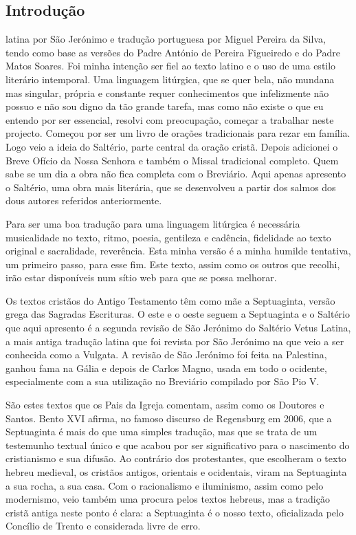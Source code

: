 
\subsection{Introdução}

 latina por São Jerónimo e tradução portuguesa por Miguel Pereira da Silva, tendo como base as versões do Padre António de Pereira Figueiredo e do Padre Matos Soares. Foi minha intenção ser fiel ao texto latino e o uso de uma estilo literário intemporal. Uma linguagem litúrgica, que se quer bela, não mundana mas singular, própria e constante requer conhecimentos que infelizmente não possuo e não sou digno da tão grande tarefa, mas como não existe o que eu entendo por ser essencial, resolvi com preocupação, começar a trabalhar neste projecto. Começou por ser um livro de orações tradicionais para rezar em família. Logo veio a ideia do Saltério, parte central da oração cristã. Depois adicionei o Breve Ofício da Nossa Senhora e também o Missal tradicional completo. Quem sabe se um dia a obra não fica completa com o Breviário. Aqui apenas apresento o Saltério, uma obra mais literária, que se desenvolveu a partir dos salmos dos dous autores referidos anteriormente.

Para ser uma boa tradução para uma linguagem litúrgica é necessária musicalidade no texto, ritmo, poesia, gentileza e cadência, fidelidade ao texto original e sacralidade, reverência. Esta minha versão é a minha humilde tentativa, um primeiro passo, para esse fim. Este texto, assim como os outros que recolhi, irão estar disponíveis num sítio web para que se possa melhorar.

Os textos cristãos do Antigo Testamento têm como mãe a Septuaginta, versão grega das Sagradas Escrituras. O este e o oeste seguem a Septuaginta e o Saltério que aqui apresento é a segunda revisão de São Jerónimo do Saltério Vetus Latina, a mais antiga tradução latina que foi revista por São Jerónimo na que veio a ser conhecida como a Vulgata. A revisão de São Jerónimo foi feita na Palestina, ganhou fama na Gália e depois de Carlos Magno, usada em todo o ocidente, especialmente com a sua utilização no Breviário compilado por São Pio V.

São estes textos que os Pais da Igreja comentam, assim como os Doutores e Santos. Bento XVI afirma, no famoso discurso de Regensburg em 2006, que a Septuaginta é mais do que uma simples tradução, mas que se trata de um testemunho textual único e que acabou por ser significativo para o nascimento do cristianismo e sua difusão. Ao contrário dos protestantes, que escolheram o texto hebreu medieval, os cristãos antigos, orientais e ocidentais, viram na Septuaginta a sua rocha, a sua casa. Com o racionalismo e iluminismo, assim como pelo modernismo, veio também uma procura pelos textos hebreus, mas a tradição cristã antiga neste ponto é clara: a Septuaginta é o nosso texto, oficializada pelo Concílio de Trento e considerada livre de erro.


